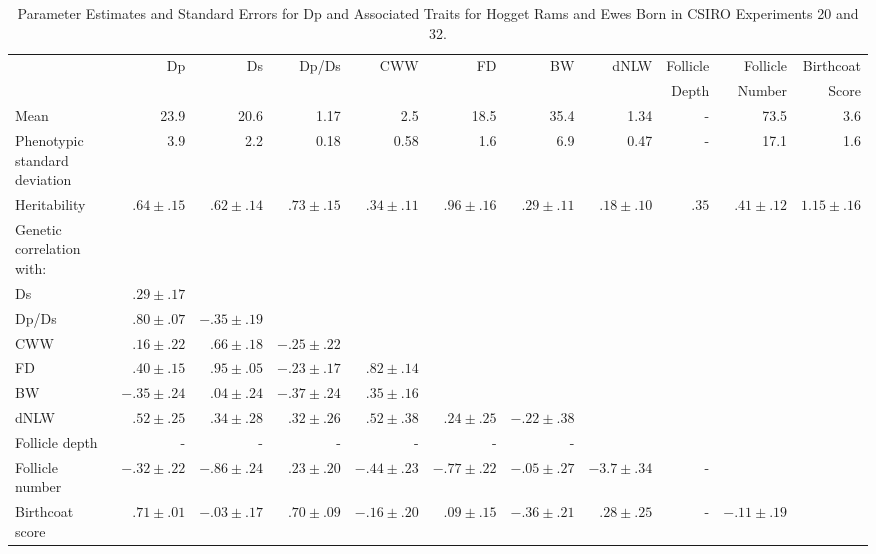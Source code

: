 %

\begin{landscape}
\begin{table} 
\footnotesize
\centering
\caption{Parameter Estimates and Standard Errors for Dp and Associated Traits
	 for Hogget Rams and Ewes Born in CSIRO Experiments 20 and 32.}
\label{tb:8} 
\vspace{0.1in}

\begin{tabular}{l|rrrrrrrrrr|}  \hline
   & Dp & Ds & Dp/Ds & CWW & FD & BW & dNLW & Follicle & Follicle & Birthcoat \\
   &    &    &       &     &    &    &      & Depth    & Number   & Score  \\ \hline

Mean & 23.9 & 20.6 &  1.17  &  2.5  & 18.5  &  35.4  & 1.34  & - &  73.5  &  3.6 \\

Phenotypic standard deviation &  3.9 & 2.2  & 0.18 &  0.58 & 1.6  &  6.9  & 0.47 &  - & 17.1 &  1.6 \\

Heritability   & $.64\pm.15$ & $.62\pm.14$ & $.73\pm.15$  & $.34\pm.11$  & $.96\pm.16$  & $.29\pm.11$ & $.18\pm.10$  & $.35$   & $.41\pm.12$  & $1.15\pm.16$ \\ \hline

Genetic correlation with: & & & & & & & & & & \\
    Ds               & $.29\pm.17$ & & & & & & & & &\\
    Dp/Ds            & $.80\pm.07$ & $-.35\pm.19$ & & & & & & & & \\
    CWW              & $.16\pm.22$ &  $.66\pm.18$ & $-.25\pm.22$ & & & & & & & \\
    FD               & $.40\pm.15$ & $.95\pm.05$  & $-.23\pm.17$ & $.82\pm.14$ & & & & & & \\
    BW             &  $-.35\pm.24$ & $.04\pm.24$  & $-.37\pm.24$ & $.35\pm.16$ & & & & & & \\
    dNLW             & $.52\pm.25$ & $.34\pm.28$  &  $.32\pm.26$ & $.52\pm.38$ & $.24\pm.25$ &  $-.22\pm.38$ & & & & \\
  Follicle depth     &     -     &    -       &  -         & -         & -         & -  & & & & \\
  Follicle number    & $-.32\pm.22$ &  $-.86\pm.24$  &  $.23\pm.20$ & $-.44\pm.23$ &  $-.77\pm.22$ &  $-.05\pm.27$ & $-3.7\pm.34$  &  - & & \\
  Birthcoat score & $.71\pm.01$   &  $-.03\pm.17$    &  $.70\pm.09$ & $-.16\pm.20$ & $.09\pm.15$   & $-.36\pm.21$  &  $.28\pm.25$  &   -  &  $-.11\pm.19$ &  \\ \hline


\end{tabular}
\end{table}
\end{landscape}
